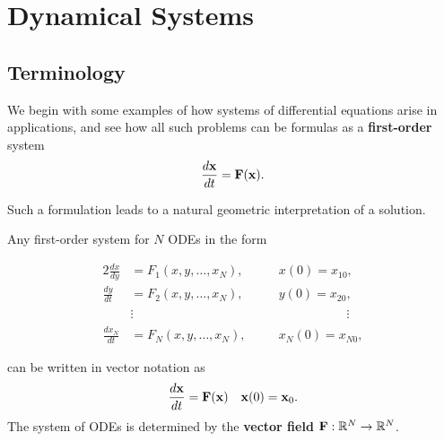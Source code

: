 \chapter{Dynamical Systems}
\section{Terminology}
We begin with some examples of how systems of differential equations arise in applications, and see how all such problems can be formulas as a \textbf{first-order} system
\[\frac{d\mathbf{x}}{dt} = \mathbf{F}(\mathbf{x}).\]

Such a formulation leads to a natural geometric interpretation of a solution.

\bigskip
Any first-order system for \(N\) ODEs in the form

\begin{alignat*}{2}
    \frac{dx}{dy}   & = F_1(x,y, \dots, x_N), \quad  &  & x(0) = x_{10},                \\
    \frac{dy}{dt}   & = F_2(x, y, \dots, x_N), \quad &  & y(0) = x_{20},                \\
                    & \vdots                         &  & \phantom{y(0) = x_{20}}\vdots \\
    \frac{dx_N}{dt} & = F_N (x,y, \dots, x_N), \quad &  & x_N(0) = x_{N0},
\end{alignat*}

can be written in vector notation as
\[\frac{d\mathbf{x}}{dt} = \mathbf{F}(\mathbf{x}) \quad \mathbf{x}(0) = \mathbf{x}_0.\]
The system of ODEs is determined by the \textbf{vector field} \(\mathbf{F}: \mathbb{R}^N \to \mathbb{R}^N\).


